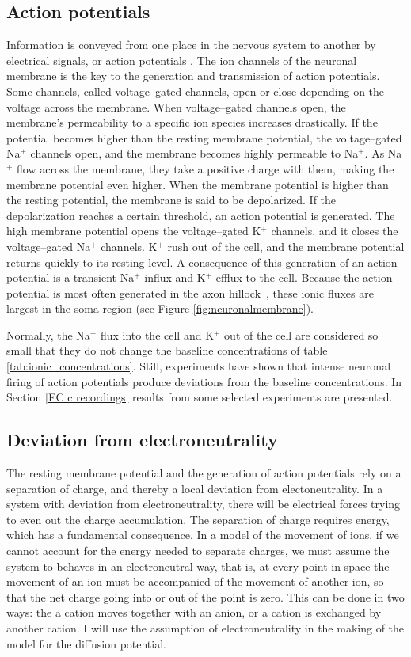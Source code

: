 \documentclass{uiophd}
\begin{document}
\subsection{Action potentials}
Information is conveyed from one place in the nervous system to another by electrical signals, or action potentials \cite{Neuroscience}.
The ion channels of the neuronal membrane is the key to the generation and transmission of action potentials. Some channels, called voltage--gated channels, open or close depending on the voltage across the membrane. When voltage--gated channels open, the membrane's permeability to a specific ion species increases drastically. If the potential becomes higher than the resting membrane potential, the voltage--gated Na$^+$ channels open, and the membrane becomes highly permeable to Na$^+$. As Na$^+$ flow across the membrane, they take a positive charge with them, making the membrane potential even higher. When the membrane potential is higher than the resting potential, the membrane is said to be depolarized. If the depolarization reaches a certain threshold, an action potential is generated. The high membrane potential opens the voltage--gated K$^+$ channels, and it closes the voltage--gated Na$^+$ channels. K$^+$ rush out of the cell, and the membrane potential returns quickly to its resting level. A consequence of this generation of an action potential is a transient Na$^+$ influx and K$^+$ efflux to the cell. Because the action potential is most often generated in the axon hillock~\cite{newworldencyclopedia}, these ionic fluxes are largest in the soma region (see Figure \ref{fig:neuronalmembrane}).


Normally, the Na$^+$ flux into the cell and K$^+$ out of the cell are considered so small that they do not change the baseline concentrations of table \ref{tab:ionic_concentrations}. Still, experiments \cite{Dietzel1982}\cite{Nicholson1987}\cite{CordingleySomjen} have shown that intense neuronal firing of action potentials produce deviations from the baseline concentrations. In Section \ref{EC c recordings} results from some selected experiments are presented.

\subsection{Deviation from electroneutrality}
The resting membrane potential and the generation of action potentials rely on a separation of charge, and thereby a local deviation from electoneutrality. In a system with deviation from electroneutrality, there will be electrical forces trying to even out the charge accumulation. The separation of charge requires energy, which has a fundamental consequence. In a model of the movement of ions, if we cannot account for the energy needed to separate charges, we must assume the system to behaves in an electroneutral way, that is, at every point in space the movement of an ion must be accompanied of the movement of another ion, so that the net charge going into or out of the point is zero. This can be done in two ways: the a cation moves together with an anion, or a cation is exchanged by another cation. I will use the assumption of electroneutrality in the making of the model for the diffusion potential.
\end{document}

